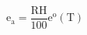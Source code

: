 \documentclass[12pt]{article}
\begin{document}
\begin{displaymath}
\mathrm{e}_{\mathrm{a}}=\frac{\mathrm{RH}}{100} \mathrm{e}^{\mathrm{o}}(\mathrm{T})
\end{displaymath}
\end{document}
